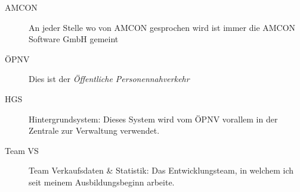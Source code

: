 \begin{description}
\item[AMCON] An jeder Stelle wo von AMCON gesprochen wird ist immer die AMCON Software GmbH gemeint
\item[ÖPNV] Dies ist der \emph{Öffentliche Personennahverkehr}
\item[HGS] Hintergrundsystem: Dieses System wird vom ÖPNV vorallem in der Zentrale zur Verwaltung verwendet. 
\item[Team VS] Team Verkaufsdaten \& Statistik: Das Entwicklungsteam, in welchem ich seit meinem Ausbildungsbeginn 
               arbeite.
\end{description}
